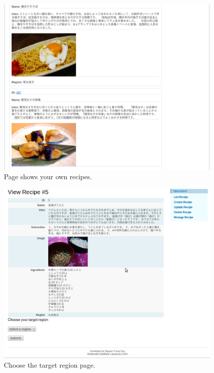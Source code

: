 \begin{figure}
\centering
\includegraphics[scale=0.5]{your_recipe.eps}
\caption{Page shows your own recipes.}
\label{fig:your_recipe}
\end{figure}

\begin{figure}
\centering
\includegraphics[scale=0.5]{choose_target.eps}
\caption{Choose the target region page.}
\label{fig:choose_target}
\end{figure}  
